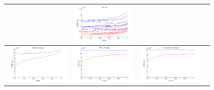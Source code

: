 \documentclass[twocolumn]{article}
\begin{document}
\begin{figure}
\begin{tabular}{|c|c|c|c|}
&\includegraphics[scale=.3]{tube_all.png}\\
\hline
\includegraphics[scale=.3]{sphere_average.png}
&\includegraphics[scale=.3]{plane_average.png}
&\includegraphics[scale=.3]{hemisphere_average.png}

\end{tabular}
\end{figure}
\end{document}
